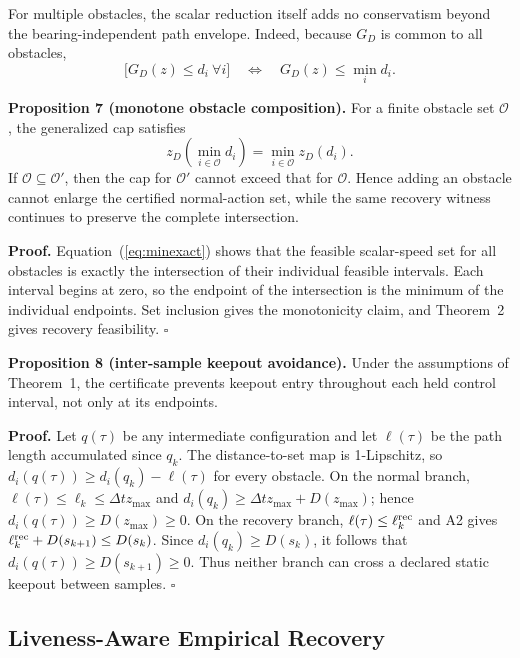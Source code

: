 \documentclass[letterpaper]{article}
\begin{document}
For multiple obstacles, the scalar reduction itself adds no conservatism
beyond the bearing-independent path envelope.  Indeed, because $G_D$ is
common to all obstacles,
\begin{equation}
 \bigl[G_D(z)\le d_i\ \forall i\bigr]
 \quad\Longleftrightarrow\quad
 G_D(z)\le\min_i d_i.                                   \label{eq:minexact}
\end{equation}

\textbf{Proposition 7 (monotone obstacle composition).}
For a finite obstacle set $\mathcal O$, the generalized cap satisfies
\begin{equation}
 z_D\!\left(\min_{i\in\mathcal O}d_i\right)
 =\min_{i\in\mathcal O} z_D(d_i).                      \label{eq:capcomposition}
\end{equation}
If $\mathcal O\subseteq\mathcal O'$, then the cap for $\mathcal O'$ cannot
exceed that for $\mathcal O$.  Hence adding an obstacle cannot enlarge the
certified normal-action set, while the same recovery witness continues to
preserve the complete intersection.

\textbf{Proof.}
Equation~(\ref{eq:minexact}) shows that the feasible scalar-speed set for all
obstacles is exactly the intersection of their individual feasible intervals.
Each interval begins at zero, so the endpoint of the intersection is the
minimum of the individual endpoints.  Set inclusion gives the monotonicity
claim, and Theorem~2 gives recovery feasibility. $\square$

\textbf{Proposition 8 (inter-sample keepout avoidance).}
Under the assumptions of Theorem~1, the certificate prevents keepout entry
throughout each held control interval, not only at its endpoints.

\textbf{Proof.}
Let $q(\tau)$ be any intermediate configuration and let $\ell(\tau)$ be the
path length accumulated since $q_k$.  The distance-to-set map is
1-Lipschitz, so
$d_i(q(\tau))\ge d_i(q_k)-\ell(\tau)$ for every obstacle.  On the normal
branch, $\ell(\tau)\le\ell_k\le\Delta t z_{\max}$ and
$d_i(q_k)\ge\Delta t z_{\max}+D(z_{\max})$; hence
$d_i(q(\tau))\ge D(z_{\max})\ge0$.  On the recovery branch,
$\ell(\tau)\le\ell_k^{\rm rec}$ and A2 gives
$\ell_k^{\rm rec}+D(s_{k+1})\le D(s_k)$.  Since
$d_i(q_k)\ge D(s_k)$, it follows that
$d_i(q(\tau))\ge D(s_{k+1})\ge0$.  Thus neither branch can cross a declared
static keepout between samples. $\square$

\subsection{Liveness-Aware Empirical Recovery}
\end{document}
